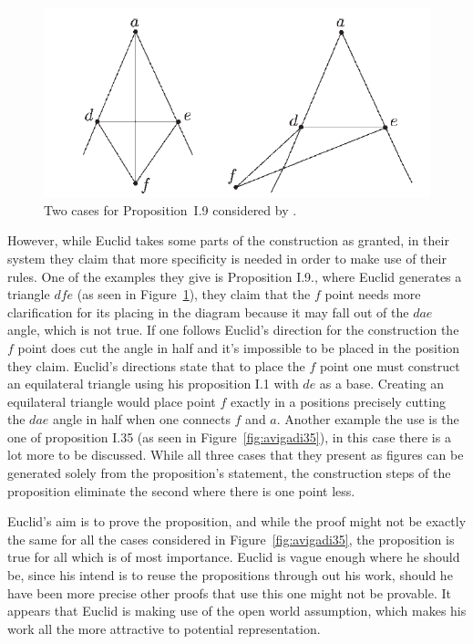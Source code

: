 \documentclass[]{interact}
\theoremstyle{plain}
\theoremstyle{definition}
\theoremstyle{remark}
\begin{document}
\begin{figure}[t]
  \centering
  \includegraphics[scale=0.5]{avigad-fig8-I9}
  \caption[Avigad et al Approach I.9]{Two cases for Proposition~I.9
    considered by \citet{avigad-etal:2009}.}
  \label{fig:avigadi9}
\end{figure}


However, while Euclid takes
some parts of the construction as granted, in their system they claim
that more specificity is needed in order to make use of their rules.
One of the examples they give is Proposition I.9., where
Euclid generates a triangle $dfe$ (as seen in
Figure~\ref{fig:avigadi9}), they claim that the $f$ point needs more
clarification for its placing in the diagram because it may fall out
of the $dae$ angle, which is not true. If one follows Euclid's
direction for the construction the $f$ point does cut the angle in
half and it's impossible to be placed in the position they claim.
Euclid's directions state that to place the $f$ point one must
construct an equilateral triangle using his proposition I.1 with $de$
as a base. Creating an equilateral triangle would place point $f$
exactly in a positions precisely cutting the $dae$ angle in half when
one connects $f$ and $a$. Another example the use is the one of
proposition I.35 (as seen in Figure~\ref{fig:avigadi35}), in this case
there is a lot more to be discussed. While all three cases that they
present as figures can be generated solely from the proposition's
statement, the construction steps of the proposition eliminate the
second where there is one point less.

Euclid's aim is to prove the proposition, and while the proof
might not be exactly the same for all the cases considered in
Figure~\ref{fig:avigadi35}, the proposition is true for all which is
of most importance. Euclid is vague enough where he should be, since
his intend is to reuse the propositions through out his work, should
he have been more precise other proofs that use this one might not be
provable. It appears that Euclid is making use of the open world
assumption, which makes his work all the more attractive to potential
representation.
\end{document}
